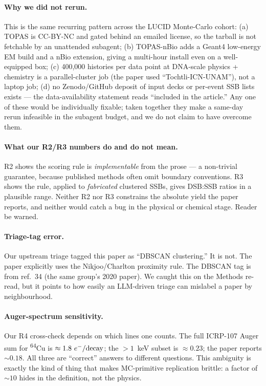 \documentclass[11pt]{article}
\begin{document}
\paragraph{Why we did not rerun.}
This is the same recurring pattern across the LUCID Monte-Carlo cohort:
(a) TOPAS is CC-BY-NC and gated behind an emailed license, so the tarball is
not fetchable by an unattended subagent;
(b) TOPAS-nBio adds a Geant4 low-energy EM build and a nBio extension, giving
a multi-hour install even on a well-equipped box;
(c) 400{,}000 histories per data point at DNA-scale physics + chemistry is a
parallel-cluster job (the paper used ``Tochtli-ICN-UNAM''), not a laptop job;
(d) no Zenodo/GitHub deposit of input decks or per-event SSB lists exists ---
the data-availability statement reads ``included in the article.''
Any one of these would be individually fixable; taken together they make a
same-day rerun infeasible in the subagent budget, and we do not claim to
have overcome them.

\paragraph{What our R2/R3 numbers do and do not mean.}
R2 shows the scoring rule is \emph{implementable} from the prose --- a
non-trivial guarantee, because published methods often omit boundary
conventions.  R3 shows the rule, applied to \emph{fabricated} clustered SSBs,
gives DSB:SSB ratios in a plausible range.  Neither R2 nor R3 constrains the
absolute yield the paper reports, and neither would catch a bug in the
physical or chemical stage.  Reader be warned.

\paragraph{Triage-tag error.}
Our upstream triage tagged this paper as ``DBSCAN clustering.''  It is not.
The paper explicitly uses the Nikjoo/Charlton proximity rule.  The DBSCAN tag
is from ref.~34 (the same group's 2020 paper).  We caught this on the
Methods re-read, but it points to how easily an LLM-driven triage can
mislabel a paper by neighbourhood.

\paragraph{Auger-spectrum sensitivity.}
Our R4 cross-check depends on which lines one counts.  The full ICRP-107
Auger sum for \textsuperscript{64}Cu is $\approx 1.8\ e^-/{\rm decay}$; the
$>1$~keV subset is $\approx 0.23$; the paper reports $\sim 0.18$.  All three
are ``correct'' answers to different questions.  This ambiguity is exactly
the kind of thing that makes MC-primitive replication brittle: a factor of
$\sim 10$ hides in the definition, not the physics.
\end{document}

